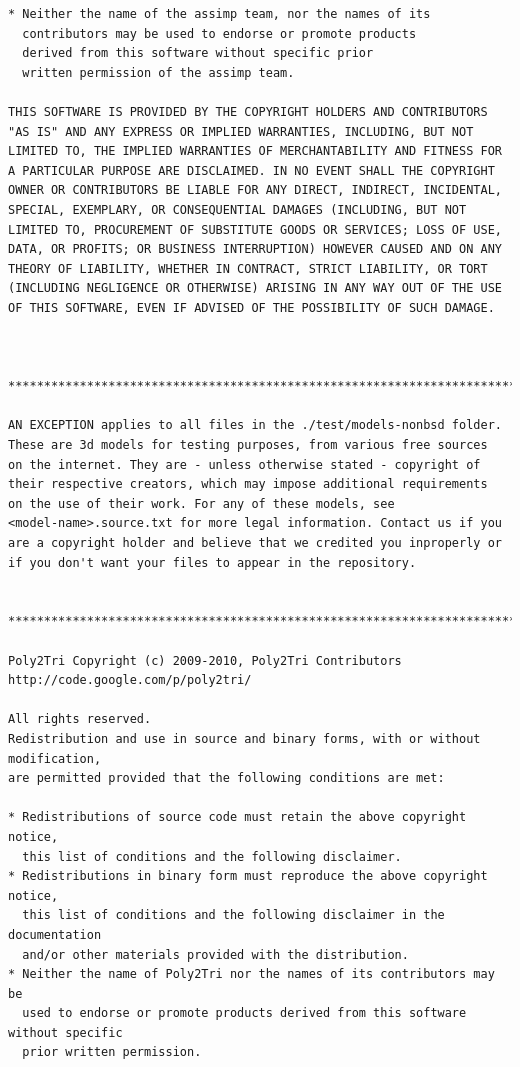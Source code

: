 \documentclass{article}
\begin{document}
\begin{lstlisting}
* Neither the name of the assimp team, nor the names of its
  contributors may be used to endorse or promote products
  derived from this software without specific prior
  written permission of the assimp team.

THIS SOFTWARE IS PROVIDED BY THE COPYRIGHT HOLDERS AND CONTRIBUTORS 
"AS IS" AND ANY EXPRESS OR IMPLIED WARRANTIES, INCLUDING, BUT NOT 
LIMITED TO, THE IMPLIED WARRANTIES OF MERCHANTABILITY AND FITNESS FOR
A PARTICULAR PURPOSE ARE DISCLAIMED. IN NO EVENT SHALL THE COPYRIGHT 
OWNER OR CONTRIBUTORS BE LIABLE FOR ANY DIRECT, INDIRECT, INCIDENTAL,
SPECIAL, EXEMPLARY, OR CONSEQUENTIAL DAMAGES (INCLUDING, BUT NOT 
LIMITED TO, PROCUREMENT OF SUBSTITUTE GOODS OR SERVICES; LOSS OF USE,
DATA, OR PROFITS; OR BUSINESS INTERRUPTION) HOWEVER CAUSED AND ON ANY 
THEORY OF LIABILITY, WHETHER IN CONTRACT, STRICT LIABILITY, OR TORT 
(INCLUDING NEGLIGENCE OR OTHERWISE) ARISING IN ANY WAY OUT OF THE USE 
OF THIS SOFTWARE, EVEN IF ADVISED OF THE POSSIBILITY OF SUCH DAMAGE.



******************************************************************************

AN EXCEPTION applies to all files in the ./test/models-nonbsd folder.
These are 3d models for testing purposes, from various free sources
on the internet. They are - unless otherwise stated - copyright of
their respective creators, which may impose additional requirements
on the use of their work. For any of these models, see 
<model-name>.source.txt for more legal information. Contact us if you
are a copyright holder and believe that we credited you inproperly or 
if you don't want your files to appear in the repository.


******************************************************************************

Poly2Tri Copyright (c) 2009-2010, Poly2Tri Contributors
http://code.google.com/p/poly2tri/

All rights reserved.
Redistribution and use in source and binary forms, with or without modification,
are permitted provided that the following conditions are met:

* Redistributions of source code must retain the above copyright notice,
  this list of conditions and the following disclaimer.
* Redistributions in binary form must reproduce the above copyright notice,
  this list of conditions and the following disclaimer in the documentation
  and/or other materials provided with the distribution.
* Neither the name of Poly2Tri nor the names of its contributors may be
  used to endorse or promote products derived from this software without specific
  prior written permission.


\end{lstlisting}
\end{document}
